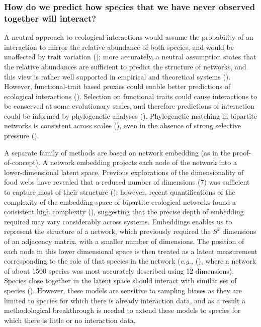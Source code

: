 \begin{refsection}
\subsubsection{How do we predict how species that we have never observed
together will
interact?}\label{how-do-we-predict-how-species-that-we-have-never-observed-together-will-interact}

A neutral approach to ecological interactions would assume the
probability of an interaction to mirror the relative abundance of both
species, and would be unaffected by trait variation
(\cite{Poisot2015Species, Pichler2020Machine}); more accurately, a neutral
assumption states that the relative abundances are sufficient to predict
the structure of networks, and this view is rather well supported in
empirical and theoretical systems (\cite{Canard2012EmeStr,
Canard2014EmpEva}). However, functional-trait based proxies could
enable better predictions of ecological interactions
(\cite{Cirtwill2018FeeEnv, Cirtwill2019QuaFra, Bartomeus2016ComFra, Bartomeus2013Understanding}). Selection on functional traits could cause
interactions to be conserved at some evolutionary scales, and therefore
predictions of interaction could be informed by phylogenetic analyses
(\cite{Davies2021EcoRed, Elmasri2020HieBay, Gomez2010EcoInt}).
Phylogenetic matching in bipartite networks is consistent across scales
(\cite{Poisot2018Interactions}), even in the absence of strong selective
pressure (\cite{Coelho2017NeuBio}).

A separate family of methods are based on network embedding (as in the
proof-of-concept). A network embedding projects each node of the network
into a lower-dimensional latent space. Previous explorations of the
dimensionality of food webs have revealed that a reduced number of
dimensions (7) was sufficient to capture most of their structure
(\cite{Eklof2013Dimensionality}); however, recent quantifications of the
complexity of the embedding space of bipartite ecological networks found
a consistent high complexity (\cite{Strydom2021SvdEnt}), suggesting that
the precise depth of embedding required may vary considerably across
systems. Embeddings enables us to represent the structure of a network,
which previously required the \(S^2\) dimensions of an adjacency matrix,
with a smaller number of dimensions. The position of each node in this
lower dimensional space is then treated as a latent measurement
corresponding to the role of that species in the network (\emph{e.g.,}
(\cite{Poisot2021ImpMam}), where a network of about 1500 species was most
accurately described using 12 dimensions). Species close together in
the latent space should interact with similar set of species
(\cite{Rossberg2006FooWeb, Rohr2010ModFoo}). However, these models are
sensitive to sampling biases as they are limited to species for which
there is already interaction data, and as a result a methodological
breakthrough is needed to extend these models to species for which there
is little or no interaction data.


\end{refsection}
